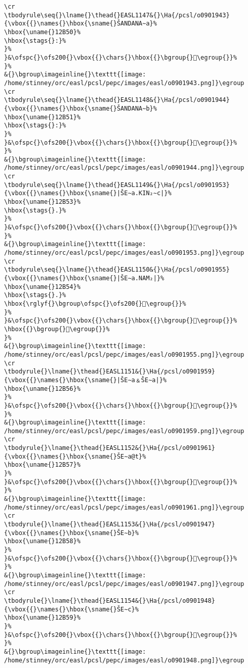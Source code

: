 \begin{verbatim}
\cr
\tbodyrule\seq{}\lname{}\thead{}EASL1147&{}\Ha{/pcsl/o0901943}{\vbox{{}\names{}\hbox{\sname{}ŠANDANA∼a}%
\hbox{\uname{}12B50}%
\hbox{\stags{}:}%
}%
}&\ofspc{}\ofs200{}\vbox{{}\chars{}\hbox{{}\bgroup{}𒭐\egroup{}}%
}%
&{}\bgroup\imageinline{}\texttt{[image: /home/stinney/orc/easl/pcsl/pepc/images/easl/o0901943.png]}\egroup
\cr
\tbodyrule\seq{}\lname{}\thead{}EASL1148&{}\Ha{/pcsl/o0901944}{\vbox{{}\names{}\hbox{\sname{}ŠANDANA∼b}%
\hbox{\uname{}12B51}%
\hbox{\stags{}:}%
}%
}&\ofspc{}\ofs200{}\vbox{{}\chars{}\hbox{{}\bgroup{}𒭑\egroup{}}%
}%
&{}\bgroup\imageinline{}\texttt{[image: /home/stinney/orc/easl/pcsl/pepc/images/easl/o0901944.png]}\egroup
\cr
\tbodyrule\seq{}\lname{}\thead{}EASL1149&{}\Ha{/pcsl/o0901953}{\vbox{{}\names{}\hbox{\sname{}|ŠE∼a.KIN₂∼c|}%
\hbox{\uname{}12B53}%
\hbox{\stags{}.}%
}%
}&\ofspc{}\ofs200{}\vbox{{}\chars{}\hbox{{}\bgroup{}𒭓\egroup{}}%
}%
&{}\bgroup\imageinline{}\texttt{[image: /home/stinney/orc/easl/pcsl/pepc/images/easl/o0901953.png]}\egroup
\cr
\tbodyrule\seq{}\lname{}\thead{}EASL1150&{}\Ha{/pcsl/o0901955}{\vbox{{}\names{}\hbox{\sname{}|ŠE∼a.NAM₂|}%
\hbox{\uname{}12B54}%
\hbox{\stags{}.}%
\hbox{\rglyf{}\bgroup\ofspc{}\ofs200{}𒭔\egroup{}}%
}%
}&\ofspc{}\ofs200{}\vbox{{}\chars{}\hbox{{}\bgroup{}𒭔\egroup{}}%
\hbox{{}\bgroup{}𒭕\egroup{}}%
}%
&{}\bgroup\imageinline{}\texttt{[image: /home/stinney/orc/easl/pcsl/pepc/images/easl/o0901955.png]}\egroup
\cr
\tbodyrule{}\lname{}\thead{}EASL1151&{}\Ha{/pcsl/o0901959}{\vbox{{}\names{}\hbox{\sname{}|ŠE∼a﹠ŠE∼a|}%
\hbox{\uname{}12B56}%
}%
}&\ofspc{}\ofs200{}\vbox{{}\chars{}\hbox{{}\bgroup{}𒭖\egroup{}}%
}%
&{}\bgroup\imageinline{}\texttt{[image: /home/stinney/orc/easl/pcsl/pepc/images/easl/o0901959.png]}\egroup
\cr
\tbodyrule{}\lname{}\thead{}EASL1152&{}\Ha{/pcsl/o0901961}{\vbox{{}\names{}\hbox{\sname{}ŠE∼a@t}%
\hbox{\uname{}12B57}%
}%
}&\ofspc{}\ofs200{}\vbox{{}\chars{}\hbox{{}\bgroup{}𒭗\egroup{}}%
}%
&{}\bgroup\imageinline{}\texttt{[image: /home/stinney/orc/easl/pcsl/pepc/images/easl/o0901961.png]}\egroup
\cr
\tbodyrule{}\lname{}\thead{}EASL1153&{}\Ha{/pcsl/o0901947}{\vbox{{}\names{}\hbox{\sname{}ŠE∼b}%
\hbox{\uname{}12B58}%
}%
}&\ofspc{}\ofs200{}\vbox{{}\chars{}\hbox{{}\bgroup{}𒭘\egroup{}}%
}%
&{}\bgroup\imageinline{}\texttt{[image: /home/stinney/orc/easl/pcsl/pepc/images/easl/o0901947.png]}\egroup
\cr
\tbodyrule{}\lname{}\thead{}EASL1154&{}\Ha{/pcsl/o0901948}{\vbox{{}\names{}\hbox{\sname{}ŠE∼c}%
\hbox{\uname{}12B59}%
}%
}&\ofspc{}\ofs200{}\vbox{{}\chars{}\hbox{{}\bgroup{}𒭙\egroup{}}%
}%
&{}\bgroup\imageinline{}\texttt{[image: /home/stinney/orc/easl/pcsl/pepc/images/easl/o0901948.png]}\egroup

\end{verbatim}
